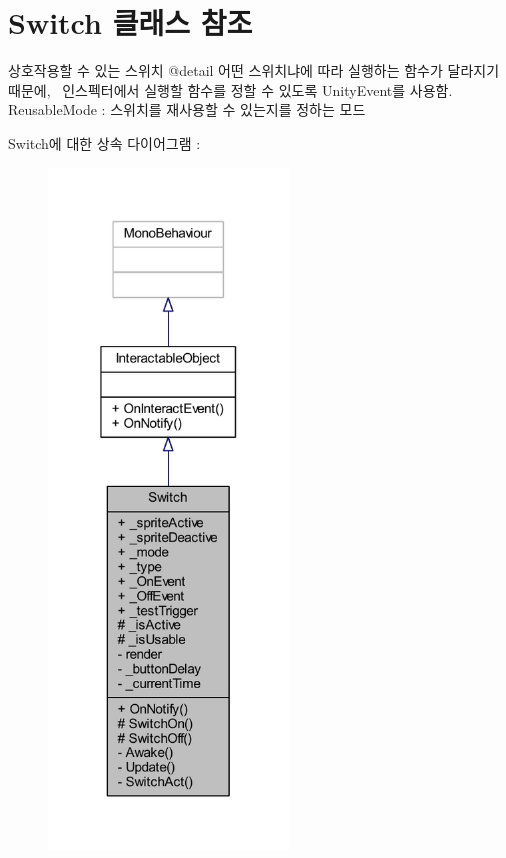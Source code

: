 \hypertarget{class_switch}{}\section{Switch 클래스 참조}
\label{class_switch}


상호작용할 수 있는 스위치 @detail 어떤 스위치냐에 따라 실행하는 함수가 달라지기 때문에,~\newline
인스펙터에서 실행할 함수를 정할 수 있도록 Unity\+Event를 사용함.~\newline
Reusable\+Mode \+: 스위치를 재사용할 수 있는지를 정하는 모드~\newline
 




Switch에 대한 상속 다이어그램 \+: 
\nopagebreak
\begin{figure}[H]
\begin{center}
\leavevmode
\includegraphics[width=181pt]{d5/d5e/class_switch__inherit__graph}
\end{center}
\end{figure}


